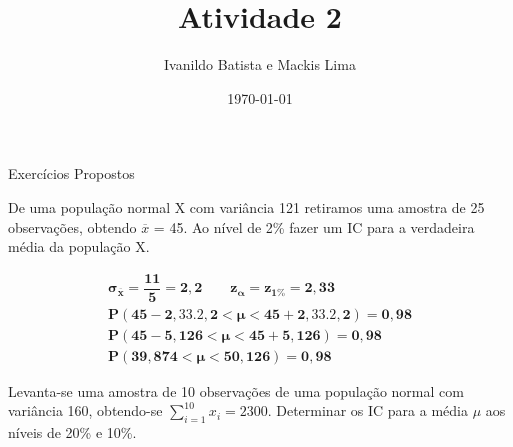 \documentclass[a4paper,notitlepage]{book}
\title{Atividade 2}
\author{Ivanildo Batista e Mackis Lima}
\date{\today}
\begin{document}
\maketitle

\begin{section}{Exercícios Propostos}

\begin{subsection}{De uma população normal X com variância 121 retiramos uma amostra de 25 observações, obtendo $\overline{x}$ = 45. Ao nível de 2\% fazer um IC para a verdadeira média da população X.}

\begin{align*}
 \mathbf{\sigma_{\overline{x}} = \dfrac{11}{5} = 2,2 \qquad z_{\alpha} = z_{1\%} = 2,33} \\
 \mathbf{P(45 - 2,33.2,2 < \mu < 45+2,33.2,2) = 0,98}\\
 \mathbf{P(45-5,126 < \mu < 45+5,126) = 0,98}\\
 \mathbf{P(39,874 < \mu < 50,126) = 0,98}
\end{align*}


\end{subsection}

\begin{subsection}{Levanta-se uma amostra de 10 observações de uma população normal com variância 160, obtendo-se $\sum_{i=1}^{10} x_i = 2300$. Determinar os IC para a média $\mu$ aos níveis de 20\% e 10\%.} 
\end{subsection}

\end{section}
\end{document}
